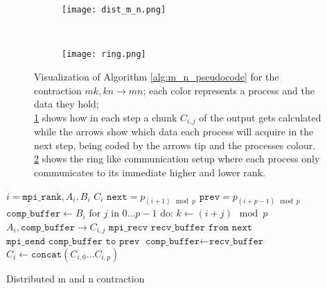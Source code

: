 \begin{figure}[ht]
    \centering
    \begin{subfigure}[t]{0.7\textwidth}
        \centering
        \texttt{[image: dist\_m\_n.png]}
        \label{fig:m_n_algo_a}
    \end{subfigure}
    ~
    \begin{subfigure}[t]{0.25\textwidth}
        \centering\texttt{[image: ring.png]}
        \label{fig:m_n_algo_b}
    \end{subfigure}
    
    \caption{Visualization of Algorithm \ref{alg:m_n_pseudocode} for the contraction $mk,kn\rightarrow mn$; 
    each color represents a process and the data they hold;\\
    \ref{fig:m_n_algo_a} shows how in each step a chunk $C_{i,j}$ of the output gets calculated while the arrows show which data each process will acquire in the next step, being coded by the arrows tip and the processes colour.\\
    \ref{fig:m_n_algo_b} shows the ring like communication setup where each process only communicates to its immediate higher and lower rank.
    }
    \label{fig:m_n_algo}
\end{figure}
    

\begin{algorithm}[ht]
        \begin{algorithmic}
        \Require $i = \texttt{mpi\_rank}, A_i, B_i$
        \Ensure $C_i$
        \State $\texttt{next} = p_{(i+1) \mod p}$
        \State $\texttt{prev} = p_{(i+p-1) \mod p}$
        \State $\texttt{comp\_buffer} \gets B_i$
        \State  $\text{for } j \text{ in } 0\dots p - 1 \text{ do:}$
        \State \indent $k \gets (i + j) \mod p$
        \State \indent {}
        \State \indent \indent $A_i, \texttt{comp\_buffer} \rightarrow C_{i,j}$
        \State \indent \indent $\texttt{mpi\_recv recv\_buffer from next}$
        \State \indent \indent $\texttt{mpi\_send comp\_buffer to prev}$
        \State \indent $\texttt{comp\_buffer} \gets \texttt{recv\_buffer}$
        \State $C_i \gets \texttt{concat}(C_{i,0}\dots C_{i,p})$
    \end{algorithmic}
    \caption{Distributed m and n contraction}
    \label{alg:m_n_pseudocode}
\end{algorithm}

